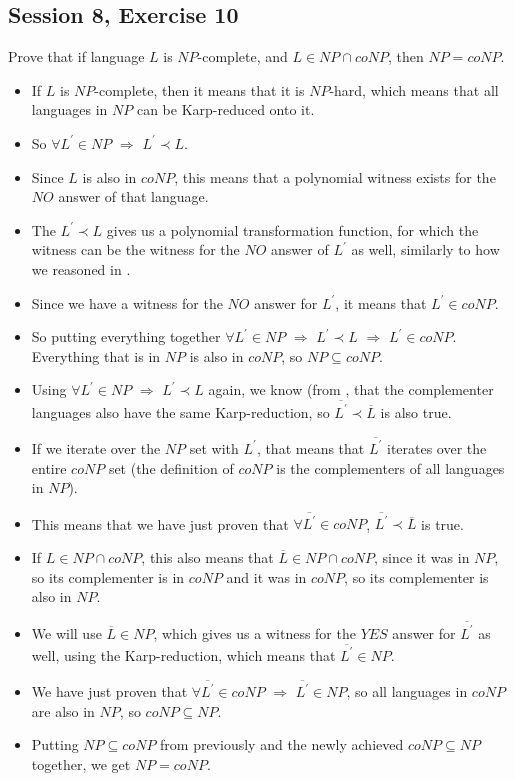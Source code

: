 \subsection {Session 8, Exercise 10}
\label{8_10}


Prove that if language $L$ is $NP$-complete, and $L\in{}NP\cap{}coNP$, then $NP=coNP$.



\begin{itemize}
    \item If $L$ is $NP$-complete, then it means that it is $NP$-hard, which means that all languages in $NP$ can be Karp-reduced onto it.
    \item So $\forall{}L^{'}\in{}NP$ $\Rightarrow$ $L^{'}\prec{}L$.
    \item Since $L$ is also in $coNP$, this means that a polynomial witness exists for the $NO$ answer of that language.
    \item The $L^{'}\prec{}L$ gives us a polynomial transformation function, for which the witness can be the witness for the $NO$ answer of $L^{'}$ as well, similarly to how we reasoned in .
    \item Since we have a witness for the $NO$ answer for $L^{'}$, it means that $L^{'}\in{}coNP$.
    \item So putting everything together $\forall{}L^{'}\in{}NP$ $\Rightarrow$ $L^{'}\prec{}L$ $\Rightarrow$ $L^{'}\in{}coNP$. Everything that is in $NP$ is also in $coNP$, so $NP\subseteq{}coNP$.
    \item Using $\forall{}L^{'}\in{}NP$ $\Rightarrow$ $L^{'}\prec{}L$ again, we know (from , that the complementer languages also have the same Karp-reduction, so $\overline{L^{'}}\prec{}\overline{L}$ is also true.
    \item If we iterate over the $NP$ set with $L^{'}$, that means that $\overline{L^{'}}$ iterates over the entire $coNP$ set (the definition of $coNP$ is the complementers of all languages in $NP$).
    \item This means that we have just proven that $\forall{}\overline{L^{'}}\in{}coNP$, $\overline{L^{'}}\prec{}\overline{L}$ is true.
    \item If $L \in{} NP\cap{}coNP$, this also means that $\overline{L} \in{} NP\cap{}coNP$, since it was in $NP$, so its complementer is in $coNP$ and it was in $coNP$, so its complementer is also in $NP$.
    \item We will use $\overline{L} \in{} NP$, which gives us a witness for the $YES$ answer for $\overline{L^{'}}$ as well, using the Karp-reduction, which means that $\overline{L^{'}}\in{}NP$.
    \item We have just proven that $\forall{}\overline{L^{'}}\in{}coNP$ $\Rightarrow$ $\overline{L^{'}}\in{}NP$, so all languages in $coNP$ are also in $NP$, so $coNP \subseteq{} NP$.
    \item Putting $NP \subseteq{} coNP$ from previously and the newly achieved $coNP \subseteq{} NP$ together, we get $NP = coNP$.
\end{itemize}